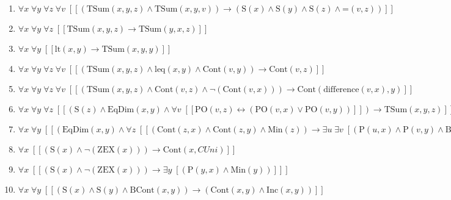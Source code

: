 \documentclass{article}
\begin{document}
\begin{enumerate}
\item $\forall x\; \forall y\; \forall z\; \forall v\;  \left[ \left[ \left(\textrm{TSum}(x,y,z) \land \textrm{TSum}(x,y,v)\right) \rightarrow \left(\textrm{S}(x) \land \textrm{S}(y) \land \textrm{S}(z) \land \textrm{=}(v,z)\right) \right] \right]$
\item $\forall x\; \forall y\; \forall z\;  \left[ \left[ \textrm{TSum}(x,y,z) \rightarrow \textrm{TSum}(y,x,z) \right] \right]$
\item $\forall x\; \forall y\;  \left[ \left[ \textrm{lt}(x,y) \rightarrow \textrm{TSum}(x,y,y) \right] \right]$
\item $\forall x\; \forall y\; \forall z\; \forall v\;  \left[ \left[ \left(\textrm{TSum}(x,y,z) \land \textrm{leq}(x,y) \land \textrm{Cont}(v,y)\right) \rightarrow \textrm{Cont}(v,z) \right] \right]$
\item $\forall x\; \forall y\; \forall z\; \forall v\;  \left[ \left[ \left(\textrm{TSum}(x,y,z) \land \textrm{Cont}(v,z) \land \neg \left(\textrm{Cont}(v,x)\right)\right) \rightarrow \textrm{Cont}(\textrm{difference}(v,x),y) \right] \right]$
\item $\forall x\; \forall y\; \forall z\;  \left[ \left[ \left(\textrm{S}(z) \land \textrm{EqDim}(x,y) \land \forall v\;  \left[ \left[ \textrm{PO}(v,z) \leftrightarrow \left(\textrm{PO}(v,x) \lor \textrm{PO}(v,y)\right) \right] \right]\right) \rightarrow \textrm{TSum}(x,y,z) \right] \right]$
\item $\forall x\; \forall y\;  \left[ \left[ \left(\textrm{EqDim}(x,y) \land \forall z\;  \left[ \left[ \left(\textrm{Cont}(z,x) \land \textrm{Cont}(z,y) \land \textrm{Min}(z)\right) \rightarrow \exists u\; \exists v\;  \left[ \left(\textrm{P}(u,x) \land \textrm{P}(v,y) \land \textrm{BCont}(z,u) \land \textrm{BCont}(z,v)\right) \right] \right] \right]\right) \rightarrow \exists z\;  \left[ \textrm{TSum}(x,y,z) \right] \right] \right]$
\item $\forall x\;  \left[ \left[ \left(\textrm{S}(x) \land \neg \left(\textrm{ZEX}(x)\right)\right) \rightarrow \textrm{Cont}(x,CUni) \right] \right]$
\item $\forall x\;  \left[ \left[ \left(\textrm{S}(x) \land \neg \left(\textrm{ZEX}(x)\right)\right) \rightarrow \exists y\;  \left[ \left(\textrm{P}(y,x) \land \textrm{Min}(y)\right) \right] \right] \right]$
\item $\forall x\; \forall y\;  \left[ \left[ \left(\textrm{S}(x) \land \textrm{S}(y) \land \textrm{BCont}(x,y)\right) \rightarrow \left(\textrm{Cont}(x,y) \land \textrm{Inc}(x,y)\right) \right] \right]$

\end{enumerate}
\end{document}
